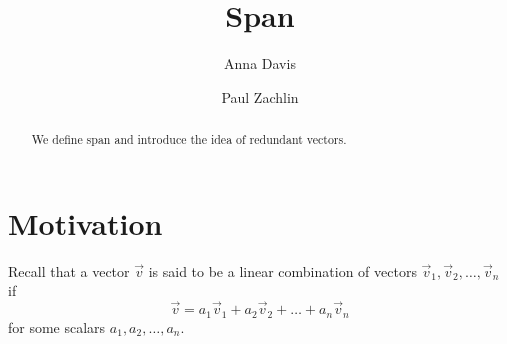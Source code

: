 \documentclass{ximera}
\author{Anna Davis \and Paul Zachlin} \title{Span} \license{CC-BY 4.0}
\begin{document}
\begin{abstract}
 We define span and introduce the idea of redundant vectors.
\end{abstract}
\maketitle


\section*{Motivation}

Recall that a vector $\vec{v}$ is said to be a linear combination of vectors $\vec{v}_1, \vec{v}_2,\ldots, \vec{v}_n$ if 
$$\vec{v}=a_1\vec{v}_1+ a_2\vec{v}_2+\ldots + a_n\vec{v}_n$$
for some scalars $a_1, a_2, \ldots ,a_n$.
\end{document}
